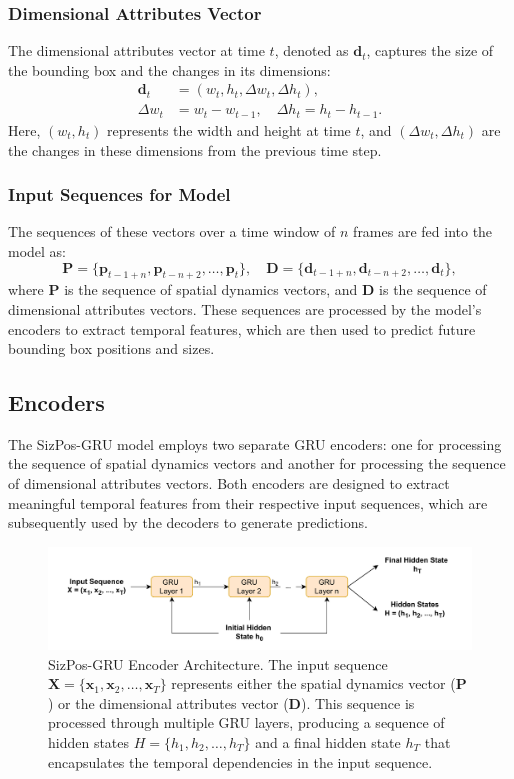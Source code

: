 \documentclass[12pt,oneside]{book} %
\begin{document}
\subsubsection*{Dimensional Attributes Vector}
The dimensional attributes vector at time $t$, denoted as $\mathbf{d}_t$, captures the size of the bounding box and the changes in its dimensions:
\begin{align}
    \mathbf{d}_t & = \left(w_t, h_t, \Delta w_t, \Delta h_t\right),    \\
    \Delta w_t   & = w_t - w_{t-1}, \quad \Delta h_t = h_t - h_{t-1}.
\end{align}
Here, $(w_t, h_t)$ represents the width and height at time $t$, and $(\Delta w_t, \Delta h_t)$ are the changes in these dimensions from the previous time step.

\subsubsection*{Input Sequences for Model}
The sequences of these vectors over a time window of \(n\) frames are fed into the model as:
\[
    \mathbf{P} = \{\mathbf{p}_{t-1+n}, \mathbf{p}_{t-n+2}, \dots, \mathbf{p}_t\}, \quad \mathbf{D} = \{\mathbf{d}_{t-1+n}, \mathbf{d}_{t-n+2}, \dots, \mathbf{d}_t\},
\]
where $\mathbf{P}$ is the sequence of spatial dynamics vectors, and
$\mathbf{D}$ is the sequence of dimensional attributes vectors. These sequences
are processed by the model's encoders to extract temporal features, which are
then used to predict future bounding box positions and sizes.

\subsection{Encoders}
The SizPos-GRU model employs two separate GRU encoders: one for processing the
sequence of spatial dynamics vectors and another for processing the sequence of
dimensional attributes vectors. Both encoders are designed to extract
meaningful temporal features from their respective input sequences, which are
subsequently used by the decoders to generate predictions.

\begin{figure}[H]
    \centering
    \includegraphics[width=1\textwidth]{figures/GRUSizPosEncoder.drawio.pdf}
    \caption{SizPos-GRU Encoder Architecture. The input sequence \( \mathbf{X} = \{\mathbf{x}_1, \mathbf{x}_2, \dots, \mathbf{x}_T\} \) represents either the spatial dynamics vector (\(\mathbf{P}\)) or the dimensional attributes vector (\(\mathbf{D}\)). This sequence is processed through multiple GRU layers, producing a sequence of hidden states \( H = \{h_1, h_2, \dots, h_T\} \) and a final hidden state \( h_T \) that encapsulates the temporal dependencies in the input sequence.}
    \label{fig:sizpos-gru-encoder}
\end{figure}
\end{document}
